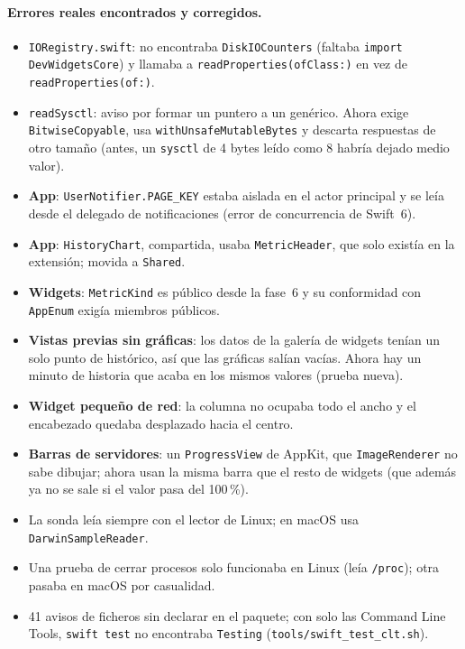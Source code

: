 \documentclass[11pt,a4paper]{article}
\begin{document}
\paragraph{Errores reales encontrados y corregidos.}
\begin{itemize}
  \item \texttt{IORegistry.swift}: no encontraba \texttt{DiskIOCounters}
    (faltaba \texttt{import DevWidgetsCore}) y llamaba a
    \texttt{readProperties(ofClass:)} en vez de
    \texttt{readProperties(of:)}.
  \item \texttt{readSysctl}: aviso por formar un puntero a un genérico.
    Ahora exige \texttt{BitwiseCopyable}, usa
    \texttt{withUnsafeMutableBytes} y descarta respuestas de otro
    tamaño (antes, un \texttt{sysctl} de 4 bytes leído como 8 habría
    dejado medio valor).
  \item \textbf{App}: \texttt{UserNotifier.PAGE\_KEY} estaba aislada
    en el actor principal y se leía desde el delegado de
    notificaciones (error de concurrencia de Swift~6).
  \item \textbf{App}: \texttt{HistoryChart}, compartida, usaba
    \texttt{MetricHeader}, que solo existía en la extensión; movida a
    \texttt{Shared}.
  \item \textbf{Widgets}: \texttt{MetricKind} es público desde la
    fase~6 y su conformidad con \texttt{AppEnum} exigía miembros
    públicos.
  \item \textbf{Vistas previas sin gráficas}: los datos de la galería
    de widgets tenían un solo punto de histórico, así que las gráficas
    salían vacías. Ahora hay un minuto de historia que acaba en los
    mismos valores (prueba nueva).
  \item \textbf{Widget pequeño de red}: la columna no ocupaba todo el
    ancho y el encabezado quedaba desplazado hacia el centro.
  \item \textbf{Barras de servidores}: un \texttt{ProgressView} de
    AppKit, que \texttt{ImageRenderer} no sabe dibujar; ahora usan la
    misma barra que el resto de widgets (que además ya no se sale si
    el valor pasa del 100\,\%).
  \item La sonda leía siempre con el lector de Linux; en macOS usa
    \texttt{DarwinSampleReader}.
  \item Una prueba de cerrar procesos solo funcionaba en Linux (leía
    \texttt{/proc}); otra pasaba en macOS por casualidad.
  \item 41 avisos de ficheros sin declarar en el paquete; con solo las
    Command Line Tools, \texttt{swift test} no encontraba
    \texttt{Testing} (\texttt{tools/swift\_test\_clt.sh}).
\end{itemize}
\end{document}
